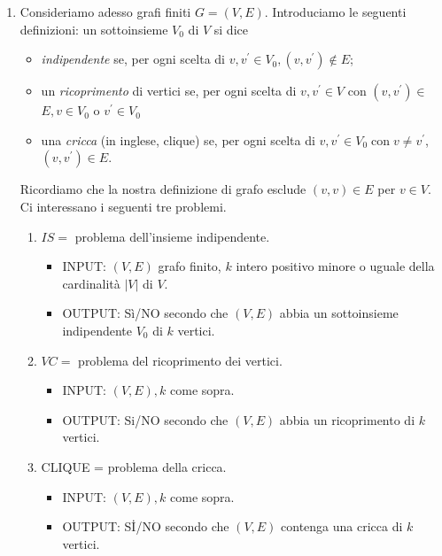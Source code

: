 \begin{enumerate}
    \item Consideriamo adesso grafi finiti $G = (V, E)$. Introduciamo le
          seguenti definizioni: un sottoinsieme $V_0$ di $V$ si dice
          \begin{itemize}
              \item \textit{indipendente} se, per ogni scelta di $v, v^{\prime}
                        \in V_0,\left(v, v^{\prime}\right) \notin E$;
              \item un \textit{ricoprimento} di vertici se, per ogni scelta di
                    $v, v^{\prime} \in V$ con $\left(v, v^{\prime}\right)
                        \in$ $E, v \in V_0$ o $v^{\prime} \in V_0$
              \item una \textit{cricca} (in inglese, clique) se, per ogni scelta
                    di $v, v^{\prime} \in V_0 \operatorname{con} v \neq
                        v^{\prime}$, $\left(v, v^{\prime}\right) \in E$.
          \end{itemize}
          Ricordiamo che la nostra definizione di grafo esclude $(v, v) \in E$
          per $v \in V$. $\mathrm{Ci}$ interessano i seguenti tre problemi.
          \begin{enumerate}
              \item $I S=$ problema dell'insieme indipendente.
                    \begin{itemize}
                        \item INPUT: $(V, E)$ grafo finito, $k$ intero positivo
                              minore o uguale della cardinalità $|V|$ di $V$.
                        \item OUTPUT: Sì/NO secondo che $(V, E)$ abbia un
                              sottoinsieme indipendente $V_0$ di $k$ vertici.
                    \end{itemize}
              \item $V C=$ problema del ricoprimento dei vertici.
                    \begin{itemize}
                        \item INPUT: $(V, E), k$ come sopra.
                        \item OUTPUT: Si/NO secondo che $(V, E)$ abbia un
                              ricoprimento di $k$ vertici.
                    \end{itemize}
              \item CLIQUE = problema della cricca.
                    \begin{itemize}
                        \item INPUT: $(V, E), k$ come sopra.
                        \item OUTPUT: Sİ/NO secondo che $(V, E)$ contenga una
                              cricca di $k$ vertici.
                    \end{itemize}


\end{enumerate}
\end{enumerate}
